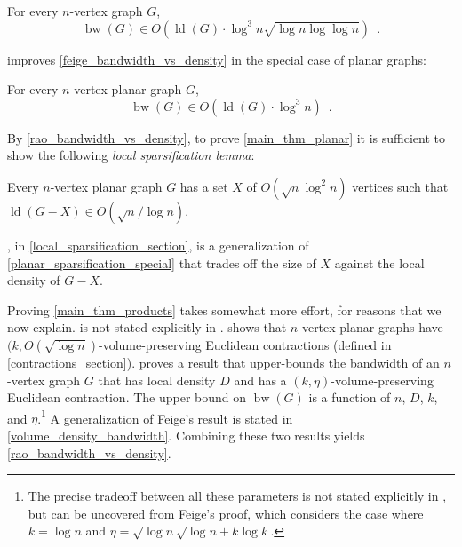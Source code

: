 \documentclass{patmorin}
\newcommand{\defin}[1]{\emph{\textcolor{brightmaroon}{#1}}}
\DeclareMathOperator{\bw}{bw}
\DeclareMathOperator{\ld}{ld}
\begin{document}
\begin{thm}\label{feige_bandwidth_vs_density}
  For every $n$-vertex graph $G$,
  \[
    \bw(G)\in O\left(\ld(G)\cdot \log^3 n\sqrt{\log n\log\log n}\right) \enspace .
  \]
\end{thm}

\citet{rao:small} improves \cref{feige_bandwidth_vs_density} in the special case of planar graphs:%

\begin{thm}
\label{rao_bandwidth_vs_density}
  For every $n$-vertex planar graph $G$,
  \[
    \bw(G)\in O\left(\ld(G)\cdot \log^3 n\right) \enspace .
  \]
\end{thm}

By \cref{rao_bandwidth_vs_density}, to prove \cref{main_thm_planar} it is sufficient to show the following \defin{local sparsification lemma}:

\begin{lem}\label{planar_sparsification_special}
  Every $n$-vertex planar graph $G$ has a set $X$ of $O(\sqrt{n}\log^2 n)$ vertices such that $\ld(G-X)\in O(\sqrt{n}/\log n)$.
\end{lem}


, in \cref{local_sparsification_section}, is a generalization of \cref{planar_sparsification_special} that trades off the size of $X$ against the local density of $G-X$.

Proving \cref{main_thm_products} takes somewhat more effort, for reasons that we now explain.
 is not stated explicitly in \cite{rao:small}. \citet{rao:small} shows that $n$-vertex planar graphs have $(k,O(\sqrt{\log n})$-volume-preserving Euclidean contractions (defined in \cref{contractions_section}). \citet{feige:approximating} proves a result that upper-bounds the bandwidth of an $n$-vertex graph $G$ that has local density $D$ and has a $(k,\eta)$-volume-preserving Euclidean contraction.  The upper bound on $\bw(G)$ is a function of $n$, $D$, $k$, and $\eta$.\footnote{The precise tradeoff between all these parameters is not stated explicitly in \cite{feige:approximating}, but can be uncovered from Feige's proof, which considers the case where $k=\log n$ and $\eta=\sqrt{\log n}\sqrt{\log n+ k\log k}$.}  A generalization of Feige's result is stated in \cref{volume_density_bandwidth}.  Combining these two results yields \cref{rao_bandwidth_vs_density}.
\end{document}

